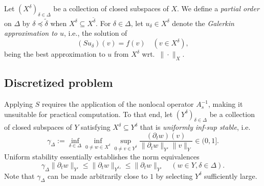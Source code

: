 \documentclass[11pt,a4paper,oneside,english]{amsart}
\numberwithin{equation}{section}
\numberwithin{theorem}{section}
\theoremstyle{definition}
\begin{document}
Let $(X^\delta)_{\delta \in \Delta}$ be a collection of closed subspaces of $X$.
We define a \emph{partial order} on $\Delta$ by $\delta \preceq \tilde{\delta}$
when $X^\delta \subseteq X^{\tilde{\delta}}$. For $\delta \in \Delta$, let
$u_\delta \in X^\delta$ denote the {\em Galerkin approximation to $u$}, i.e., the solution of
\begin{equation}
(Su_\delta)(v)=f(v) \quad (v \in X^\delta),
  \label{eqn:galerkin}
\end{equation}
being the best approximation to $u$ from $X^\delta$ wrt.~$\|\cdot\|_X$.

\subsection{Discretized problem}
Applying $S$ requires the application of the nonlocal operator $A_s^{-1}$, making it
unsuitable for practical computation. To that end, let $(Y^\delta)_{\delta \in \Delta}$
be a collection of closed subspaces of $Y$ satisfying $X^\delta \subseteq Y^\delta$
that is \emph{uniformly inf-sup stable}, i.e.
\begin{equation}
  \gamma_\Delta:=\inf_{\delta \in \Delta}\inf_{0 \neq w \in X^\delta}\sup_{0\neq v \in Y^\delta} \frac{(\partial_t w)(v)}{\|\partial_t w\|_{Y'}\|v\|_Y} \in (0,1].
  \label{eqn:infinfsup}
\end{equation}
Uniform stability essentially establishes the norm equivalences
\[
  \gamma_\Delta \|\partial_t w\|_{Y'} \leq \|\partial_t w\|_{{Y^\delta}'} \leq \|\partial_t w\|_{Y'} \quad (w \in Y, \delta \in \Delta).
\]
Note that $\gamma_\Delta$ can be made arbitrarily close to $1$ by selecting $Y^\delta$ sufficiently large.
\end{document}
